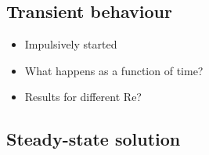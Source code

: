 \documentclass[final,3p,twocolumn]{elsarticle}
\begin{document}
\subsection{Transient behaviour}
\label{subsec:transient}

\begin{itemize}
    \item Impulsively started
    \item What happens as a function of time? 
    \item Results for different Re? 
\end{itemize}

\subsection{Steady-state solution}
\label{subsec:steady}
\end{document}
